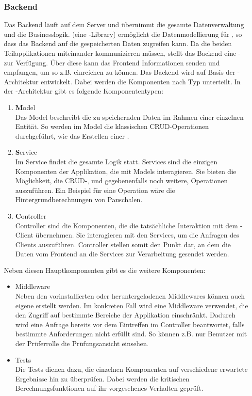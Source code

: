 \subsubsection{Backend}
\label{sec:Planungsphase:Backend}

Das Backend läuft auf dem Server und übernimmt die gesamte Datenverwaltung und die Businesslogik.  (eine -Library) ermöglicht die Datenmodellierung für , so dass das Backend auf die gespeicherten Daten zugreifen kann.
Da die beiden Teilapplikationen miteinander kommunizieren müssen, stellt das Backend eine - zur Verfügung. Über diese kann das Frontend Informationen senden und empfangen, um so z.B.  einreichen zu können.
Das Backend wird auf Basis der -Architektur entwickelt. Dabei werden die Komponenten nach Typ unterteilt. In der -Architektur gibt es folgende Komponententypen:

\begin{enumerate}
  \item \textbf{M}odel\\
  Das Model beschreibt die zu speichernden Daten im Rahmen einer einzelnen Entität. So werden im Model die klassischen CRUD-Operationen durchgeführt, wie das Erstellen einer .
  \item \textbf{S}ervice\\
  Im Service findet die gesamte Logik statt. Services sind die einzigen Komponenten der Applikation, die mit Models interagieren. Sie bieten die Möglichkeit, die CRUD-, und gegebenenfalls noch weitere, Operationen auszuführen. Ein Beispiel für eine Operation wäre die Hintergrundberechnungen von Pauschalen.
  \item \textbf{C}ontroller\\
  Controller sind die Komponenten, die die tatsächliche Interaktion mit dem -Client übernehmen. Sie interagieren mit den Services, um die Anfragen des Clients auszuführen. Controller stellen somit den Punkt dar, an dem die Daten vom Frontend an die Services zur Verarbeitung gesendet werden.
\end{enumerate}

Neben diesen Hauptkomponenten gibt es die weitere Komponenten:

\begin{itemize}
  \item Middleware\\
Neben den vorinstallierten oder heruntergeladenen Middlewares können auch eigene erstellt werden. Im konkreten Fall wird eine Middleware verwendet, die den Zugriff auf bestimmte Bereiche der Applikation einschränkt. Dadurch wird eine Anfrage bereits vor dem Eintreffen im Controller beantwortet, falls bestimmte Anforderungen nicht erfüllt sind. So können z.B. nur Benutzer mit der Prüferrolle die Prüfungsansicht einsehen.
  \item Tests\\
  Die Tests dienen dazu, die einzelnen Komponenten auf verschiedene erwartete Ergebnisse hin zu überprüfen. Dabei werden die kritischen Berechnungsfunktionen auf ihr vorgesehenes Verhalten geprüft.
\end{itemize}

